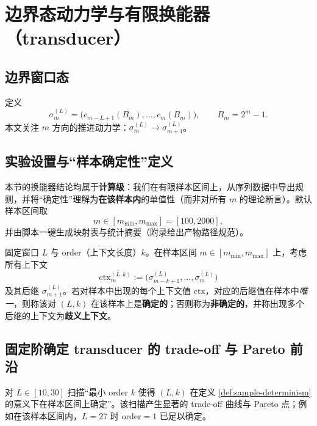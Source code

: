 
\section{边界态动力学与有限换能器（transducer）}

\subsection{边界窗口态}

定义
$$
\sigma_m^{(L)}=\big(c_{m-L+1}(B_m),\dots,c_m(B_m)\big),\qquad B_m=2^m-1.
$$
本文关注 $m$ 方向的推进动力学：$\sigma_m^{(L)}\to\sigma_{m+1}^{(L)}$。

\subsection{实验设置与“样本确定性”定义}

本节的换能器结论均属于\textbf{计算级}：我们在有限样本区间上，从序列数据中导出规则，并将“确定性”理解为\textbf{在该样本内}的单值性（而非对所有 $m$ 的理论断言）。默认样本区间取
$$
m\in[m_{\min},m_{\max}]=[100,2000],
$$
并由脚本一键生成映射表与统计摘要（附录给出产物路径规范）。

\begin{definition}[样本确定性与歧义上下文]\label{def:sample-determinism}
固定窗口 $L$ 与 order（上下文长度）$k$。在样本区间 $m\in[m_{\min},m_{\max}]$ 上，考虑所有上下文
$$
\mathrm{ctx}_m^{(L,k)}:=\big(\sigma_{m-k+1}^{(L)},\dots,\sigma_m^{(L)}\big)
$$
及其后继 $\sigma_{m+1}^{(L)}$。若对样本中出现的每个上下文值 $\mathrm{ctx}$，对应的后继值在样本中\emph{唯一}，则称该对 $(L,k)$ 在该样本上是\textbf{确定的}；否则称为\textbf{非确定的}，并称出现多个后继的上下文为\textbf{歧义上下文}。
\end{definition}

\subsection{固定阶确定 transducer 的 trade-off 与 Pareto 前沿}

对 $L\in[10,30]$ 扫描“最小 order $k$ 使得 $(L,k)$ 在定义 \ref{def:sample-determinism} 的意义下在样本区间上确定”。该扫描产生显著的 trade-off 曲线与 Pareto 点；例如在该样本区间内，$L=27$ 时 order$=1$ 已足以确定。

\begin{table}[H]
\centering

\caption{固定窗口 $L=10..30$ 的最小确定阶数扫描表（由脚本自动生成）。}
\end{table}

